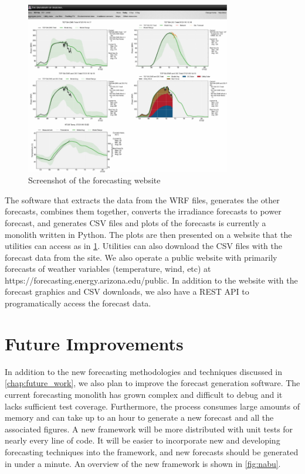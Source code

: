 \begin{figure}[htb]
\centering
\includegraphics[width=0.8\textwidth]{figs/web_example.pdf}
\caption{Screenshot of the forecasting website}
\label{fig:website}
\end{figure}

The software that extracts the data from the WRF files, generates the
other forecasts, combines them together, converts the irradiance
forecasts to power forecast, and generates CSV files and plots of the
forecasts is currently a monolith written in Python.
The plots are then presented on a website that the utilities can
access as in \cref{fig:website}.
Utilities can also download the CSV files with the forecast data from the site.
We also operate a public website with primarily forecasts of weather
variables (temperature, wind, etc) at
https://forecasting.energy.arizona.edu/public.
In addition to the website with the forecast graphics and CSV
downloads, we also have a REST API to programatically access the
forecast data.

\section{Future Improvements}
\label{sec:futurefx}

In addition to the new forecasting methodologies and techniques
discussed in \cref{chap:future_work}, we also plan to improve the
forecast generation software.
The current forecasting monolith has grown complex and difficult to
debug and it lacks sufficient test coverage.
Furthermore, the process consumes large amounts of memory and can take
up to an hour to generate a new forecast and all the associated
figures.
A new framework will be more distributed with unit tests for nearly
every line of code.
It will be easier to incorporate new and developing
forecasting techniques into the framework, and new forecasts should be
generated in under a minute.
An overview of the new framework is shown in \cref{fig:nabu}.

